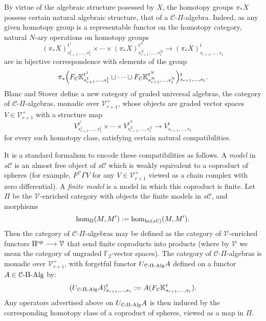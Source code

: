 \documentclass[11pt]{amsart}
\theoremstyle{plain}
\theoremstyle{definition}
\renewcommand{\to}{\longrightarrow}
\newcommand{\calC}{\mathcal{C}}
\newcommand{\calV}{\mathcal{V}}
\newcommand{\calc}{\mathcal{C}}
\theoremstyle{plain}
\newcommand{\vect}[2]{\calV^{#1}_{#2}}
\newcommand{\PiAlg}{\textup{-$\Pi$-Alg}}
\newcommand{\F}{\mathbb{F}}
\begin{document}
\begin{CPiAlgs and CHalgs}
By virtue of the algebraic structure posessed by $X$, the homotopy groups $\pi_*X$ possess certain natural algebraic structure, that of a $\calc$-$\Pi$-algebra. Indeed, as any given homotopy group is a representable functor on the homotopy category, natural $N$-ary operations on homotopy groups
\[(\pi_*X)_{s_{r+1}^{1},\ldots,s_{1}^{1}}^{t^1}\times\cdots \times(\pi_*X)_{s_{r+1}^{N},\ldots,s_{1}^{N}}^{t^N}\to (\pi_*X)_{s_{r+1},\ldots,s_{1}}^{t}\]
are in bijective correspondence with elements of the group
\[ \pi_*\Bigl(F_\calC\mathbb{K}_{s_{r+1}^{1},\ldots,s_{1}^{1}}^{t^1}\sqcup\cdots\sqcup F_\calC\mathbb{K}_{s_{r+1}^{N},\ldots,s_{1}^{N}}^{t^N}\Bigr)\makebox[0cm][l]{}_{s_{r+1},\ldots,s_{1}}^{t}.\]
Blanc and Stover \cite{Blanc_Stover-Groth_SS.pdf} define a new category of graded universal algebras, the category of $\calC$-$\Pi$-algebras, monadic over $\vect{+}{r+1}$, whose objects are graded vector spaces $V\in\vect{+}{r+1}$ with a structure map 
\[V_{s_{r+1}^{1},\ldots,s_{1}^{1}}^{t^1}\times\cdots \times V_{s_{r+1}^{N},\ldots,s_{1}^{N}}^{t^N}\to V_{s_{r+1},\ldots,s_{1}}^{t}\]
for every such homotopy class, satisfying certain natural compatibilities.

It is a standard formalism to encode these compatibilities as follows. A \emph{model}  \cite{Blanc_Stover-Groth_SS.pdf} in $s\calc$ is 
an almost free object of $s\calc$ which is weakly equivalent to a coproduct of spheres (for example, $F^{\calC}\Gamma V$ for any $V\in\vect{+}{r+1}$ viewed as a chain complex with zero differential). A \emph{finite model} is a model in which this coproduct is finite. Let $\Pi$  be the $\vect{}{}$-enriched category with objects the finite models in $s\calc$, and morphisms
\[\hom_{\Pi}(M,M'):=\hom_{\textup{ho}(s\calc)}(M,M').\]
Then the category of $\calc$-$\Pi$-algebras  may be defined as the category of $\vect{}{}$-enriched functors $\Pi^\textup{op}\to \vect{}{}$ that send finite coproducts into products (where by $\vect{}{}$ we mean the category of ungraded $\F_2$-vector spaces). The category of $\calc$-$\Pi$-algebras is monadic over $\vect{+}{r+1}$, with  forgetful functor $U_{\calc\PiAlg}A$ defined on a functor $A\in \calc\PiAlg$ by:%
\[(U_{\calc\PiAlg}A)^t_{s_{r+1},\ldots,s_1}:=A(F_\calC\mathbb{K}_{s_{r+1},\ldots,s_{1}}^{t}).\]
Any operators advertised above on $U_{\calc\PiAlg}A$ is then induced by the corresponding homotopy class of a coproduct of spheres, viewed as a map in $\Pi$. %


\end{CPiAlgs and CHalgs}
\end{document}
